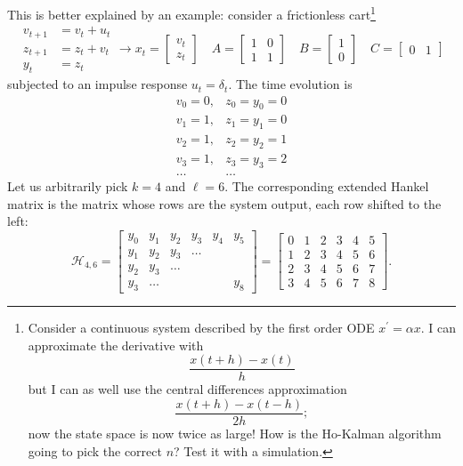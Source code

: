 This is better explained by an example: consider a frictionless cart\footnote{Consider a continuous system described by the first order ODE $x^\prime = \alpha x$. I can approximate the derivative with
  \begin{equation*}
    \frac{x(t+h)-x(t)}{h}
  \end{equation*}
  but I can as well use the central differences approximation
  \begin{equation*}
    \frac{x(t+h)-x(t-h)}{2h};
  \end{equation*}
  now the state space is now twice as large! How is the Ho-Kalman algorithm going to pick the correct $n$? Test it with a simulation.}
\begin{equation*}
  \begin{aligned}
    v_{t+1} &= v_t + u_t \\
    z_{t+1} &= z_t + v_t \\
    y_t &= z_t
  \end{aligned} \longrightarrow
  x_t =
  \begin{bmatrix}
    v_t \\ z_t
  \end{bmatrix}\quad A =
    \begin{bmatrix}
      1 & 0 \\ 1 & 1
    \end{bmatrix}\quad B =
    \begin{bmatrix}
      1 \\ 0
    \end{bmatrix}\quad C =
    \begin{bmatrix}
      0 & 1
    \end{bmatrix}
\end{equation*}
subjected to an impulse response $u_t=\delta_t$. The time evolution is
\begin{equation*}
  \begin{matrix}
    v_0 = 0, & z_0 = y_0 = 0 \\
    v_1 = 1, & z_1 = y_1 = 0 \\
    v_2 = 1, & z_2 = y_2 = 1 \\
    v_3 = 1, & z_3 = y_3 = 2 \\
    \ldots & \ldots
  \end{matrix}
\end{equation*}
Let us arbitrarily pick $k=4$ and $\ell=6$. The corresponding extended Hankel matrix is the matrix whose rows are the system output, each row shifted to the left:
\begin{equation*}
  \mathcal{H}_{4,6} =
  \begin{bmatrix}
    y_0 & y_1 & y_2 & y_3 & y_4 & y_5 \\
    y_1 & y_2 & y_3 & \ldots & & \\
    y_2 & y_3 & \ldots & & & \\
    y_3 & \ldots & & & & y_8
  \end{bmatrix} =
  \begin{bmatrix}
    0 & 1 & 2 & 3 & 4 & 5 \\
    1 & 2 & 3 & 4 & 5 & 6 \\
    2 & 3 & 4 & 5 & 6 & 7 \\
    3 & 4 & 5 & 6 & 7 & 8
  \end{bmatrix}.
\end{equation*}
